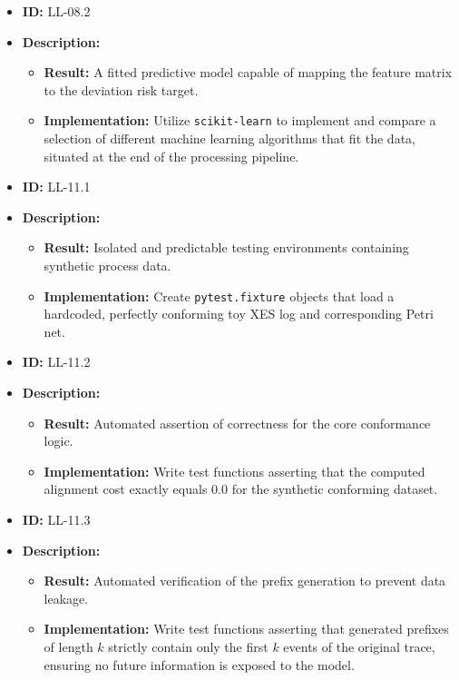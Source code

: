\documentclass[12pt,a4paper]{article}
\begin{document}
\begin{itemize}
    \item \textbf{ID:} LL-08.2
    \item \textbf{Description:}
    \begin{itemize}
        \item \textbf{Result:} A fitted predictive model capable of mapping the feature matrix to the deviation risk target.
        \item \textbf{Implementation:} Utilize \texttt{scikit-learn} to implement and compare a selection of different machine learning algorithms that fit the data, situated at the end of the processing pipeline.
    \end{itemize}
\end{itemize}
\vspace{1.5em}

\begin{itemize}
    \item \textbf{ID:} LL-11.1
    \item \textbf{Description:}
    \begin{itemize}
        \item \textbf{Result:} Isolated and predictable testing environments containing synthetic process data.
        \item \textbf{Implementation:} Create \texttt{pytest.fixture} objects that load a hardcoded, perfectly conforming toy XES log and corresponding Petri net.
    \end{itemize}
\end{itemize}
\vspace{1.5em}

\begin{itemize}
    \item \textbf{ID:} LL-11.2
    \item \textbf{Description:}
    \begin{itemize}
        \item \textbf{Result:} Automated assertion of correctness for the core conformance logic.
        \item \textbf{Implementation:} Write test functions asserting that the computed alignment cost exactly equals $0.0$ for the synthetic conforming dataset.
    \end{itemize}
\end{itemize}
\vspace{1.5em}

\begin{itemize}
    \item \textbf{ID:} LL-11.3
    \item \textbf{Description:}
    \begin{itemize}
        \item \textbf{Result:} Automated verification of the prefix generation to prevent data leakage.
        \item \textbf{Implementation:} Write test functions asserting that generated prefixes of length $k$ strictly contain only the first $k$ events of the original trace, ensuring no future information is exposed to the model.
    \end{itemize}
\end{itemize}
\vspace{1.5em}
\end{document}
